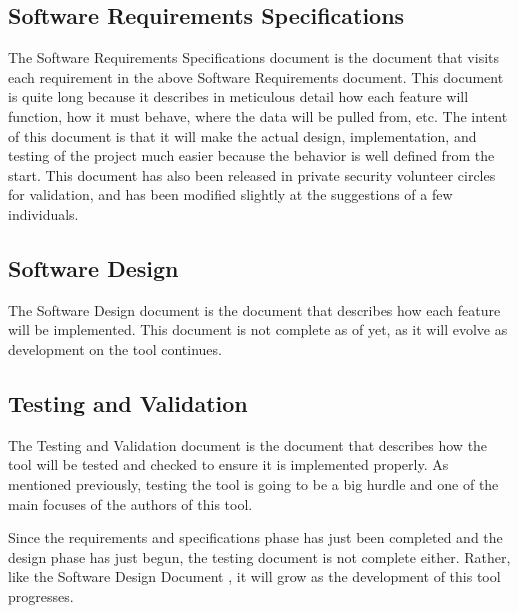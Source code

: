 \documentclass[letterpaper,12pt]{article}
\begin{document}
\subsection{Software Requirements Specifications}
\label{software_specifications}
The Software Requirements Specifications document \cite{Specification} is the
document that visits each requirement in the above Software Requirements
document.  This document is quite long because it describes in meticulous detail
how each feature will function, how it must behave, where the data will be
pulled from, etc.  The intent of this document is that it will make the actual
design, implementation, and testing of the project much easier because the
behavior is well defined from the start.  This document has also been released
in private security volunteer circles for validation, and has been modified
slightly at the suggestions of a few individuals.

\subsection{Software Design}
\label{software_design}
The Software Design document \cite{Design} is the document that describes how
each feature will be implemented.  This document is not complete as of yet, as
it will evolve as development on the tool continues.  

\subsection{Testing and Validation}
\label{testing_and_evaluation}
The Testing and Validation document \cite{Testing} is the document that
describes how the tool will be tested and checked to ensure it is implemented
properly.  As mentioned previously, testing the tool is going to be a big hurdle
and one of the main focuses of the authors of this tool.  

Since the requirements and specifications phase has just been completed and the
design phase has just begun, the testing document is not complete either. 
Rather, like the Software Design Document \cite{Design}, it will grow as the
development of this tool progresses.  

\newpage
\end{document}
